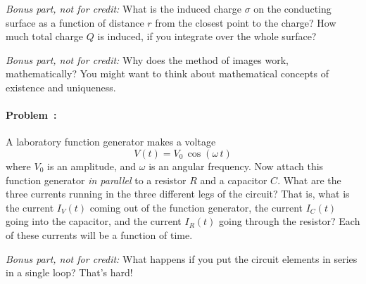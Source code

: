 \documentclass[12pt]{article}
\begin{document}
\textsl{Bonus part, not for credit:} What is the induced charge
$\sigma$ on the conducting surface as a function of distance $r$ from
the closest point to the charge? How much total charge $Q$ is induced, if
you integrate over the whole surface?

\textsl{Bonus part, not for credit:} Why does the method of images work,
mathematically? You might want to think about mathematical concepts of
existence and uniqueness.

\paragraph{Problem~\theproblem:}%
A laboratory function generator makes a voltage
\begin{equation}
V(t) = V_0\,\cos(\omega\,t)
\end{equation}
where $V_0$ is an amplitude, and $\omega$ is an angular frequency. Now
attach this function generator \emph{in parallel} to a resistor $R$ and
a capacitor $C$. What are the three currents running in the three different
legs of the circuit? That is, what is the current $I_V(t)$ coming out of the function
generator, the current $I_C(t)$ going into the capacitor, and the current $I_R(t)$ going
through the resistor? Each of these currents will be a function of time.

\textsl{Bonus part, not for credit:} What happens if you put the circuit
elements in series in a single loop? That's hard!
\end{document}
